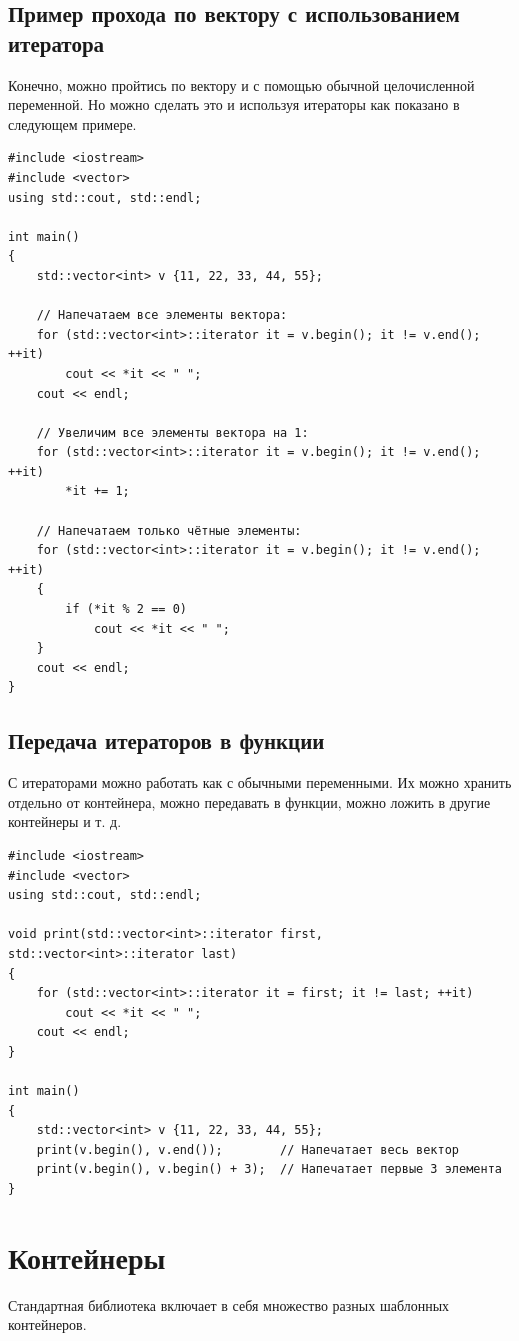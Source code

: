 \documentclass{article}
\begin{document}
\subsection*{Пример прохода по вектору с использованием итератора}
Конечно, можно пройтись по вектору и с помощью обычной целочисленной переменной.
Но можно сделать это и используя итераторы как показано в следующем примере.
\begin{lstlisting}
#include <iostream>
#include <vector>
using std::cout, std::endl;

int main()
{
    std::vector<int> v {11, 22, 33, 44, 55};
    
    // Напечатаем все элементы вектора:
    for (std::vector<int>::iterator it = v.begin(); it != v.end(); ++it)
        cout << *it << " ";
    cout << endl;    
   
    // Увеличим все элементы вектора на 1:
    for (std::vector<int>::iterator it = v.begin(); it != v.end(); ++it)
        *it += 1;
        
    // Напечатаем только чётные элементы:
    for (std::vector<int>::iterator it = v.begin(); it != v.end(); ++it)
    {
        if (*it % 2 == 0)
            cout << *it << " ";
    }
    cout << endl;
}
\end{lstlisting}


\subsection*{Передача итераторов в функции}
С итераторами можно работать как с обычными переменными. Их можно хранить отдельно от контейнера, можно передавать в функции, можно ложить в другие контейнеры и т. д.
\begin{lstlisting}
#include <iostream>
#include <vector>
using std::cout, std::endl;

void print(std::vector<int>::iterator first, std::vector<int>::iterator last)
{
    for (std::vector<int>::iterator it = first; it != last; ++it)
        cout << *it << " ";
    cout << endl;   
}

int main()
{
    std::vector<int> v {11, 22, 33, 44, 55};
    print(v.begin(), v.end());        // Напечатает весь вектор 
    print(v.begin(), v.begin() + 3);  // Напечатает первые 3 элемента 
}

\end{lstlisting}

\newpage
\section*{Контейнеры}
Стандартная библиотека включает в себя множество разных шаблонных контейнеров.
\end{document}
